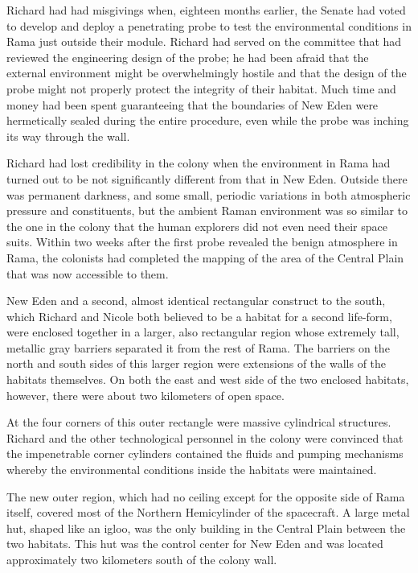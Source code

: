 \documentclass[]{article}
\begin{document}
{Richard had had misgivings when, eighteen months earlier, the Senate had voted to develop and deploy a penetrating probe to test the environmental conditions in Rama just outside their module. Richard had served on the committee that had reviewed the engineering design of the probe; he had been afraid that the external environment might be overwhelmingly hostile and that the design of the probe might not properly protect the integrity of their habitat. Much time and money had been spent guaranteeing that the boundaries of New Eden were hermetically sealed during the entire procedure, even while the probe was inching its way through the wall.

Richard had lost credibility in the colony when the environment in Rama had turned out to be not significantly different from that in New Eden. Outside there was permanent darkness, and some small, periodic variations in both atmospheric pressure and constituents, but the ambient Raman environment was so similar to the one in the colony that the human explorers did not even need their space suits. Within two weeks after the first probe revealed the benign atmosphere in Rama, the colonists had completed the mapping of the area of the Central Plain that was now accessible to them.

New Eden and a second, almost identical rectangular construct to the south, which Richard and Nicole both believed to be a habitat for a second life-form, were enclosed together in a larger, also rectangular region whose extremely tall, metallic gray barriers separated it from the rest of Rama. The barriers on the north and south sides of this larger region were extensions of the walls of the habitats themselves. On both the east and west side of the two enclosed habitats, however, there were about two kilometers of open space.

At the four corners of this outer rectangle were massive cylindrical structures. Richard and the other technological personnel in the colony were convinced that the impenetrable corner cylinders contained the fluids and pumping mechanisms whereby the environmental conditions inside the habitats were maintained.

The new outer region, which had no ceiling except for the opposite side of Rama itself, covered most of the Northern Hemicylinder of the spacecraft. A large metal hut, shaped like an igloo, was the only building in the Central Plain between the two habitats. This hut was the control center for New Eden and was located approximately two kilometers south of the colony wall.

}
\end{document}
